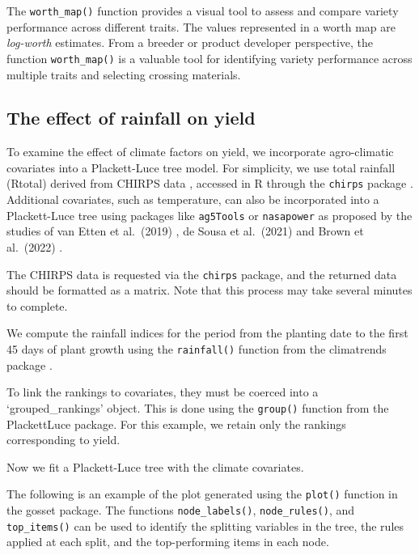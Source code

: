 \documentclass[
]{book}
\begin{document}
The \texttt{worth\_map()} function provides a visual tool to assess and compare variety performance across different traits. The values represented in a worth map are \emph{log-worth} estimates. From a breeder or product developer perspective, the function \texttt{worth\_map()} is a valuable tool for identifying variety performance across multiple traits and selecting crossing materials.

\subsection{The effect of rainfall on yield}\label{the-effect-of-rainfall-on-yield}

To examine the effect of climate factors on yield, we incorporate agro-climatic covariates into a Plackett-Luce tree model. For simplicity, we use total rainfall (Rtotal) derived from CHIRPS data \citep{Funk2015}, accessed in R through the \texttt{chirps} package \citep{chirps}. Additional covariates, such as temperature, can also be incorporated into a Plackett-Luce tree using packages like \texttt{ag5Tools} \citep{ag5tools} or \texttt{nasapower} \citep{nasapower} as proposed by the studies of van Etten et al.~(2019) \citep{vanEtten2019}, de Sousa et al.~(2021) \citep{deSousa2021} and Brown et al.~(2022) \citep{Brown2022}.

The CHIRPS data is requested via the \texttt{chirps} package, and the returned data should be formatted as a matrix. Note that this process may take several minutes to complete.

We compute the rainfall indices for the period from the planting date to the first 45 days of plant growth using the \texttt{rainfall()} function from the climatrends package \citep{climatrends}.

To link the rankings to covariates, they must be coerced into a `grouped\_rankings' object. This is done using the \texttt{group()} function from the PlackettLuce package. For this example, we retain only the rankings corresponding to yield.

Now we fit a Plackett-Luce tree with the climate covariates.

The following is an example of the plot generated using the \texttt{plot()} function in the gosset package. The functions \texttt{node\_labels()}, \texttt{node\_rules()}, and \texttt{top\_items()} can be used to identify the splitting variables in the tree, the rules applied at each split, and the top-performing items in each node.
\end{document}
